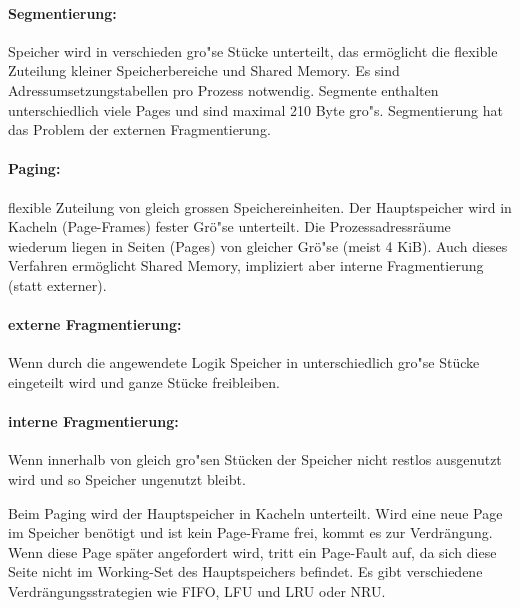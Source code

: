 \begin{answer}
  \paragraph{Segmentierung:}Speicher wird in verschieden gro"se Stücke unterteilt, das ermöglicht die flexible Zuteilung kleiner Speicherbereiche und Shared Memory. Es sind Adressumsetzungstabellen pro Prozess notwendig. Segmente enthalten unterschiedlich viele Pages und sind maximal 210 Byte gro"s. Segmentierung hat das Problem der externen Fragmentierung.

  \paragraph{Paging:} flexible Zuteilung von gleich grossen Speichereinheiten. Der Hauptspeicher wird in Kacheln (Page-Frames)
  fester Grö"se unterteilt. Die Prozessadressräume wiederum liegen in Seiten (Pages) von
  gleicher Grö"se (meist 4 KiB). Auch dieses Verfahren ermöglicht Shared Memory, impliziert aber interne Fragmentierung (statt externer).

  \paragraph{externe Fragmentierung:} Wenn durch die angewendete Logik Speicher in unterschiedlich gro"se
  Stücke eingeteilt wird und ganze Stücke freibleiben.

  \paragraph{interne Fragmentierung:} Wenn innerhalb von gleich gro"sen Stücken der Speicher nicht restlos
  ausgenutzt wird und so Speicher ungenutzt bleibt.
\end{answer}

\begin{answer}
  Beim Paging wird der Hauptspeicher in Kacheln  unterteilt.
  Wird eine neue Page im Speicher benötigt und ist kein Page-Frame frei, kommt es zur Verdrängung.
  Wenn diese Page später angefordert wird, tritt ein Page-Fault auf, da sich diese Seite nicht im Working-Set des Hauptspeichers befindet.
  Es gibt verschiedene Verdrängungsstrategien wie FIFO, LFU und LRU oder NRU.
\end{answer}

